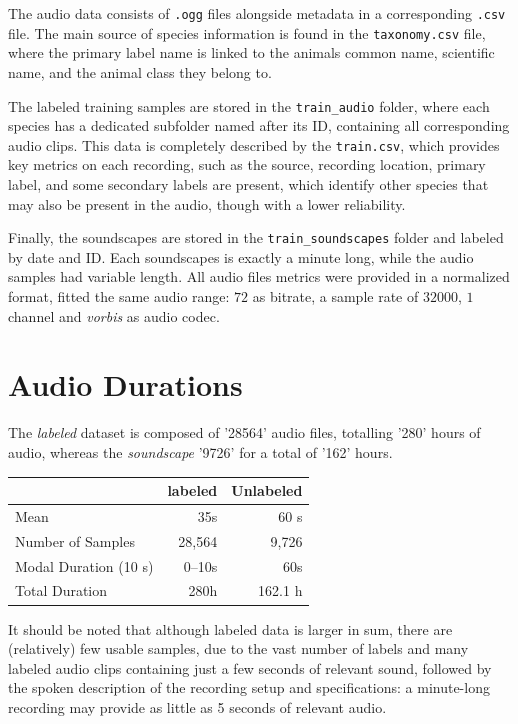\documentclass[10pt]{article}
\begin{document}
The audio data consists of \texttt{.ogg} files alongside metadata in a corresponding \texttt{.csv} file. The main source of species information is found in the \texttt{taxonomy.csv} file, where the primary label name is linked to the animals common name, scientific name, and the animal class they belong to.

The labeled training samples are stored in the \texttt{train\_audio} folder, where each species has a dedicated subfolder named after its ID, containing all corresponding audio clips. This data is completely described by the \texttt{train.csv}, which provides key metrics on each recording, such as the source, recording location, primary label, and some secondary labels are present, which identify other species that may also be present in the audio, though with a lower reliability.

Finally, the soundscapes are stored in the \texttt{train\_soundscapes} folder and labeled by date and ID. Each soundscapes is exactly a minute long, while the audio samples had variable length. All audio files metrics were provided in a normalized format, fitted the same audio range: $72$ as bitrate, a sample rate of $32000$, $1$ channel and \textit{vorbis} as audio codec.

\section*{Audio Durations}

The \textit{labeled} dataset is composed of '28564' audio files, totalling '280' hours of audio, whereas the \textit{soundscape} '9726' for a total of '162' hours.

\begin{table}[h!]
  \centering
  \begin{tabular}{|l|r|r|}
    \hline
    & \textbf{labeled} & \textbf{Unlabeled} \\
    \hline
    Mean                  & 35s      & 60 s       \\
    Number of Samples      & 28,564   & 9,726      \\
    Modal Duration (10 s)  & 0--10s   & 60s        \\
    Total Duration         & 280h     & 162.1 h    \\
    \hline
  \end{tabular}
\end{table}

It should be noted that although labeled data is larger in sum, there are (relatively) few usable samples, due to the vast number of labels and many labeled audio clips containing just a few seconds of relevant sound, followed by the spoken description of the recording setup and specifications: a minute-long recording may provide as little as 5 seconds of relevant audio. 
\end{document}
